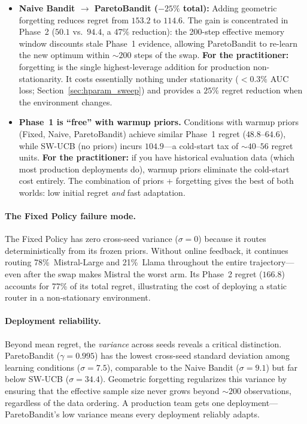\begin{itemize}[nosep,leftmargin=*]
  \item \textbf{Naive Bandit $\to$ ParetoBandit ($-25\%$ total):}
    Adding geometric forgetting reduces regret from $153.2$ to
    $114.6$.  The gain is concentrated in Phase~2 ($50.1$ vs.\
    $94.4$, a $47\%$ reduction): the 200-step effective memory
    window discounts stale Phase~1 evidence, allowing ParetoBandit
    to re-learn the new optimum within ${\sim}200$ steps of
    the swap.
    \textbf{For the practitioner:} forgetting is the single
    highest-leverage addition for production non-stationarity.
    It costs essentially nothing under stationarity
    (${<}0.3\%$ AUC loss; Section~\ref{sec:hparam_sweep})
    and provides a $25\%$ regret reduction when the environment
    changes.

  \item \textbf{Phase~1 is ``free'' with warmup priors.}
    Conditions with warmup priors (Fixed, Naive, ParetoBandit)
    achieve similar Phase~1 regret ($48.8$--$64.6$), while
    SW-UCB (no priors) incurs $104.9$---a cold-start tax of
    ${\sim}40$--$56$ regret units.
    \textbf{For the practitioner:} if you have historical
    evaluation data (which most production deployments do),
    warmup priors eliminate the cold-start cost entirely.
    The combination of priors + forgetting gives the best of
    both worlds: low initial regret \emph{and} fast adaptation.
\end{itemize}

\paragraph{The Fixed Policy failure mode.}
The Fixed Policy has zero cross-seed variance ($\sigma{=}0$)
because it routes deterministically from its frozen priors.
Without online feedback, it continues routing 78\%~Mistral-Large
and 21\%~Llama throughout the entire trajectory---even after
the swap makes Mistral the worst arm.
Its Phase~2 regret ($166.8$) accounts for 77\% of its total regret,
illustrating the cost of deploying a static router in a
non-stationary environment.

\paragraph{Deployment reliability.}
Beyond mean regret, the \emph{variance} across seeds reveals a
critical distinction.
ParetoBandit ($\gamma{=}0.995$) has the lowest cross-seed standard
deviation among learning conditions ($\sigma{=}7.5$), comparable
to the Naive Bandit ($\sigma{=}9.1$) but far below SW-UCB
($\sigma{=}34.4$).
Geometric forgetting regularizes this variance by ensuring that
the effective sample size never grows beyond ${\sim}200$
observations, regardless of the data ordering.
A production team gets one deployment---ParetoBandit's low variance
means every deployment reliably adapts.

